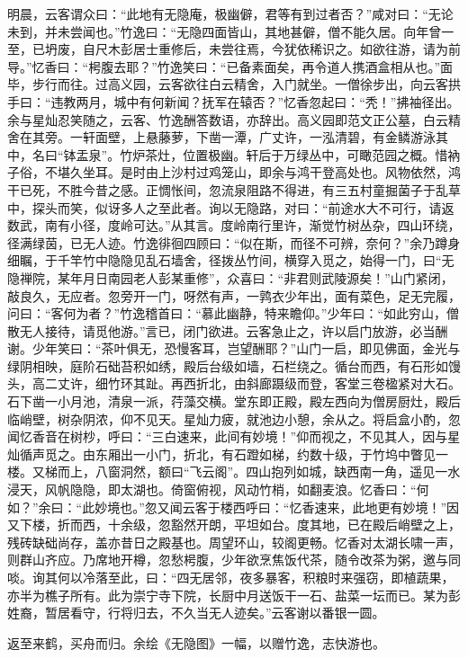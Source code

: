 \documentclass[]{article}
\begin{document}
明晨，云客谓众曰：``此地有无隐庵，极幽僻，君等有到过者否？''咸对曰：``无论未到，并未尝闻也。''竹逸曰：``无隐四面皆山，其地甚僻，僧不能久居。向年曾一至，已坍废，自尺木彭居士重修后，未尝往焉，今犹依稀识之。如欲往游，请为前导。''忆香曰：``枵腹去耶？''竹逸笑曰：``已备素面矣，再令道人携酒盒相从也。''面毕，步行而往。过高义园，云客欲往白云精舍，入门就坐。一僧徐步出，向云客拱手曰：``违教两月，城中有何新闻？抚军在辕否？''忆香忽起曰：``秃！''拂袖径出。余与星灿忍笑随之，云客、竹逸酬答数语，亦辞出。高义园即范文正公墓，白云精舍在其旁。一轩面壁，上悬藤萝，下凿一潭，广丈许，一泓清碧，有金鳞游泳其中，名曰``钵盂泉''。竹炉茶灶，位置极幽。轩后于万绿丛中，可瞰范园之概。惜衲子俗，不堪久坐耳。是时由上沙村过鸡笼山，即余与鸿干登高处也。风物依然，鸿干已死，不胜今昔之感。正惆怅间，忽流泉阻路不得进，有三五村童掘菌子于乱草中，探头而笑，似讶多人之至此者。询以无隐路，对曰：``前途水大不可行，请返数武，南有小径，度岭可达。''从其言。度岭南行里许，渐觉竹树丛杂，四山环绕，径满绿茵，已无人迹。竹逸徘徊四顾曰：``似在斯，而径不可辨，奈何？''余乃蹲身细瞩，于千竿竹中隐隐见乱石墙舍，径拨丛竹间，横穿入觅之，始得一门，曰``无隐禅院，某年月日南园老人彭某重修''，众喜曰：``非君则武陵源矣！''山门紧闭，敲良久，无应者。忽旁开一门，呀然有声，一鹑衣少年出，面有菜色，足无完履，问曰：``客何为者？''竹逸稽首曰：``慕此幽静，特来瞻仰。''少年曰：``如此穷山，僧散无人接待，请觅他游。''言已，闭门欲进。云客急止之，许以启门放游，必当酬谢。少年笑曰：``茶叶俱无，恐慢客耳，岂望酬耶？''山门一启，即见佛面，金光与绿阴相映，庭阶石础苔积如绣，殿后台级如墙，石栏绕之。循台而西，有石形如馒头，高二丈许，细竹环其趾。再西折北，由斜廊蹑级而登，客堂三卷楹紧对大石。石下凿一小月池，清泉一派，荇藻交横。堂东即正殿，殿左西向为僧房厨灶，殿后临峭壁，树杂阴浓，仰不见天。星灿力疲，就池边小憩，余从之。将启盒小酌，忽闻忆香音在树杪，呼曰：``三白速来，此间有妙境！''仰而视之，不见其人，因与星灿循声觅之。由东厢出一小门，折北，有石蹬如梯，约数十级，于竹坞中瞥见一楼。又梯而上，八窗洞然，额曰``飞云阁''。四山抱列如城，缺西南一角，遥见一水浸天，风帆隐隐，即太湖也。倚窗俯视，风动竹梢，如翻麦浪。忆香曰：``何如？''余曰：``此妙境也。''忽又闻云客于楼西呼曰：``忆香速来，此地更有妙境！''因又下楼，折而西，十余级，忽豁然开朗，平坦如台。度其地，已在殿后峭壁之上，残砖缺础尚存，盖亦昔日之殿基也。周望环山，较阁更畅。忆香对太湖长啸一声，则群山齐应。乃席地开樽，忽愁枵腹，少年欲烹焦饭代茶，随令改茶为粥，邀与同啖。询其何以冷落至此，曰：``四无居邻，夜多暴客，积粮时来强窃，即植蔬果，亦半为樵子所有。此为崇宁寺下院，长厨中月送饭干一石、盐菜一坛而已。某为彭姓裔，暂居看守，行将归去，不久当无人迹矣。''云客谢以番银一圆。

返至来鹤，买舟而归。余绘《无隐图》一幅，以赠竹逸，志快游也。
\end{document}
